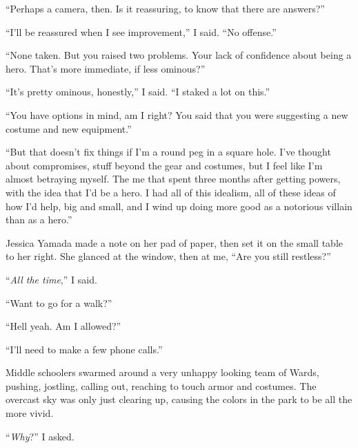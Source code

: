 ``Perhaps a camera, then.  Is it reassuring, to know that there are answers?''



``I'll be reassured when I see improvement,'' I said.  ``No offense.''



``None taken.  But you raised two problems.  Your lack of confidence about being a hero.  That's more immediate, if less ominous?''



``It's pretty ominous, honestly,'' I said.  ``I staked a lot on this.''



``You have options in mind, am I right?  You said that you were suggesting a new costume and new equipment.''



``But that doesn't fix things if I'm a round peg in a square hole.  I've thought about compromises, stuff beyond the gear and costumes, but I feel like I'm almost betraying myself.  The me that spent three months after getting powers, with the idea that I'd be a hero.  I had all of this idealism, all of these ideas of how I'd help, big and small, and I wind up doing more good as a notorious villain than as a hero.''



Jessica Yamada made a note on her pad of paper, then set it on the small table to her right.  She glanced at the window, then at me, ``Are you still restless?''



``\emph{All the time},'' I said.



``Want to go for a walk?''



``Hell yeah.  Am I allowed?''



``I'll need to make a few phone calls.''



\blacksquare



Middle schoolers swarmed around a very unhappy looking team of Wards, pushing, jostling, calling out, reaching to touch armor and costumes.  The overcast sky was only just clearing up, causing the colors in the park to be all the more vivid.



``\emph{Why}?'' I asked.



